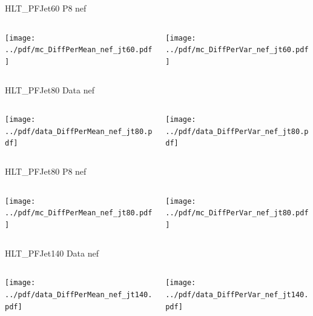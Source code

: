 \documentclass[9pt]{beamer}
\begin{document}
\begin{frame}[t]{HLT\_PFJet60 P8 nef}
\begin{columns}[T]
  \begin{column}{.5\textwidth}
  \texttt{[image: ../pdf/mc\_DiffPerMean\_nef\_jt60.pdf]}
  \end{column}
  \begin{column}{.5\textwidth}
  \texttt{[image: ../pdf/mc\_DiffPerVar\_nef\_jt60.pdf]}
  \end{column}
\end{columns}
\end{frame}

\begin{frame}[t]{HLT\_PFJet80 Data nef}
\begin{columns}[T]
  \begin{column}{.5\textwidth}
  \texttt{[image: ../pdf/data\_DiffPerMean\_nef\_jt80.pdf]}
  \end{column}
  \begin{column}{.5\textwidth}
  \texttt{[image: ../pdf/data\_DiffPerVar\_nef\_jt80.pdf]}
  \end{column}
\end{columns}
\end{frame}

\begin{frame}[t]{HLT\_PFJet80 P8 nef}
\begin{columns}[T]
  \begin{column}{.5\textwidth}
  \texttt{[image: ../pdf/mc\_DiffPerMean\_nef\_jt80.pdf]}
  \end{column}
  \begin{column}{.5\textwidth}
  \texttt{[image: ../pdf/mc\_DiffPerVar\_nef\_jt80.pdf]}
  \end{column}
\end{columns}
\end{frame}

\begin{frame}[t]{HLT\_PFJet140 Data nef}
\begin{columns}[T]
  \begin{column}{.5\textwidth}
  \texttt{[image: ../pdf/data\_DiffPerMean\_nef\_jt140.pdf]}
  \end{column}
  \begin{column}{.5\textwidth}
  \texttt{[image: ../pdf/data\_DiffPerVar\_nef\_jt140.pdf]}
  \end{column}
\end{columns}
\end{frame}
\end{document}
